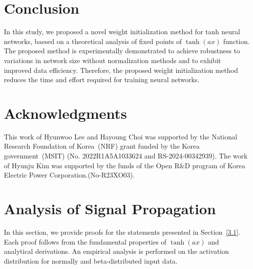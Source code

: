\documentclass{article} \usepackage{iclr2025_conference,times}
\begin{document}
\section{Conclusion}
In this study, we proposed a novel weight initialization method for tanh neural networks, baesed on a theoretical analysis of fixed points of $\tanh(ax)$ function. The proposed method is experimentally demonstrated to achieve robustness to variations in network size without normalization methods and to exhibit improved data efficiency. Therefore, the proposed weight initialization method reduces the time and effort required for training neural networks.







\section*{Acknowledgments}
This work of Hyunwoo Lee and Hayoung Choi was supported by the National Research Foundation of Korea~(NRF) grant funded by the Korea government~(MSIT) (No. 2022R1A5A1033624 and RS-2024-00342939).
The work of Hyunju Kim was supported by the funds of the Open R$\&$D program of Korea Electric Power Corporation.(No-R23XO03).





\newpage
\appendix
\section{Analysis of Signal Propagation}\label{app0}
In this section, we provide proofs for the statements presented in Section~\ref{3.1}. 
Each proof follows from the fundamental properties of $\tanh(ax)$ and analytical derivations. 
An empirical analysis is performed on the activation distribution for normally and beta-distributed input data.
\end{document}
